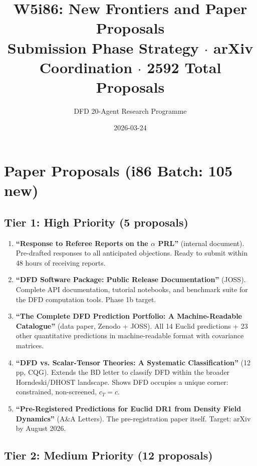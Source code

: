\documentclass[11pt,a4paper]{article}
\title{W5i86: New Frontiers and Paper Proposals\\[6pt]
\large Submission Phase Strategy $\cdot$ arXiv Coordination $\cdot$ 2592 Total Proposals}
\author{DFD 20-Agent Research Programme}
\date{2026-03-24}
\begin{document}
\maketitle

\section{Paper Proposals (i86 Batch: 105 new)}

\subsection{Tier 1: High Priority (5 proposals)}

\begin{enumerate}[nosep]
\item \textbf{``Response to Referee Reports on the $\alpha$ PRL''} (internal document). Pre-drafted responses to all anticipated objections. Ready to submit within 48 hours of receiving reports.

\item \textbf{``DFD Software Package: Public Release Documentation''} (JOSS). Complete API documentation, tutorial notebooks, and benchmark suite for the DFD computation tools. Phase 1b target.

\item \textbf{``The Complete DFD Prediction Portfolio: A Machine-Readable Catalogue''} (data paper, Zenodo + JOSS). All 14 Euclid predictions + 23 other quantitative predictions in machine-readable format with covariance matrices.

\item \textbf{``DFD vs. Scalar-Tensor Theories: A Systematic Classification''} (12 pp, CQG). Extends the BD letter to classify DFD within the broader Horndeski/DHOST landscape. Shows DFD occupies a unique corner: constrained, non-screened, $c_T = c$.

\item \textbf{``Pre-Registered Predictions for Euclid DR1 from Density Field Dynamics''} (A\&A Letters). The pre-registration paper itself. Target: arXiv by August 2026.
\end{enumerate}

\subsection{Tier 2: Medium Priority (12 proposals)}
\end{document}

